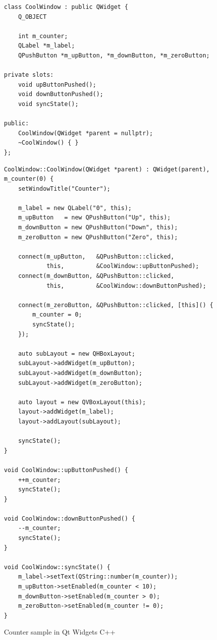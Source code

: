 \documentclass[11pt]{report}
\begin{document}
\begin{figure}[h]
\begin{minipage}[t]{1\columnwidth - 2\fboxsep - 7.5\fboxrule - 1pt}%
\begin{verbatim}
class CoolWindow : public QWidget {
    Q_OBJECT

    int m_counter;
    QLabel *m_label;
    QPushButton *m_upButton, *m_downButton, *m_zeroButton;

private slots:
    void upButtonPushed();
    void downButtonPushed();
    void syncState();

public:
    CoolWindow(QWidget *parent = nullptr);
    ~CoolWindow() { }
};
\end{verbatim}
%
\end{minipage}\smallskip{}

\begin{minipage}[t]{1\columnwidth - 2\fboxsep - 7.5\fboxrule - 1pt}%
\begin{verbatim}
CoolWindow::CoolWindow(QWidget *parent) : QWidget(parent), m_counter(0) {
    setWindowTitle("Counter");

    m_label = new QLabel("0", this);
    m_upButton   = new QPushButton("Up", this);
    m_downButton = new QPushButton("Down", this);
    m_zeroButton = new QPushButton("Zero", this);

    connect(m_upButton,   &QPushButton::clicked,
            this,         &CoolWindow::upButtonPushed);
    connect(m_downButton, &QPushButton::clicked,
            this,         &CoolWindow::downButtonPushed);

    connect(m_zeroButton, &QPushButton::clicked, [this]() {
        m_counter = 0;
        syncState();
    });

    auto subLayout = new QHBoxLayout;
    subLayout->addWidget(m_upButton);
    subLayout->addWidget(m_downButton);
    subLayout->addWidget(m_zeroButton);

    auto layout = new QVBoxLayout(this);
    layout->addWidget(m_label);
    layout->addLayout(subLayout);

    syncState();
}

void CoolWindow::upButtonPushed() {
    ++m_counter;
    syncState();
}

void CoolWindow::downButtonPushed() {
    --m_counter;
    syncState();
}

void CoolWindow::syncState() {
    m_label->setText(QString::number(m_counter));
    m_upButton->setEnabled(m_counter < 10);
    m_downButton->setEnabled(m_counter > 0);
    m_zeroButton->setEnabled(m_counter != 0);
}
\end{verbatim}
%
\end{minipage}\caption{\label{fig:QtCounter}Counter sample in Qt Widgets C++}
\end{figure}
\end{document}
